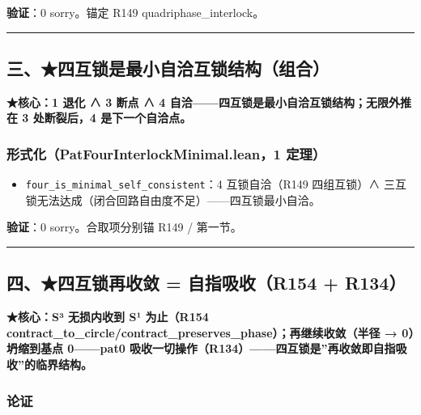 \documentclass[
]{article}
\providecommand{\tightlist}{%
  \setlength{\itemsep}{0pt}\setlength{\parskip}{0pt}}
\begin{document}
\textbf{验证}：0 sorry。锚定 R149 quadriphase\_interlock。

\begin{center}\rule{0.5\linewidth}{0.5pt}\end{center}

\subsection{三、★四互锁是最小自洽互锁结构（组合）}\label{ux4e09ux56dbux4e92ux9501ux662fux6700ux5c0fux81eaux6d3dux4e92ux9501ux7ed3ux6784ux7ec4ux5408}

\textbf{★核心：1 退化 ∧ 3 断点 ∧ 4
自洽------四互锁是最小自洽互锁结构；无限外推在 3 处断裂后，4
是下一个自洽点。}

\subsubsection{形式化（PatFourInterlockMinimal.lean，1
定理）}\label{ux5f62ux5f0fux5316patfourinterlockminimal.lean1-ux5b9aux7406}

\begin{itemize}
\tightlist
\item
  \texttt{four\_is\_minimal\_self\_consistent}：4 互锁自洽（R149
  四组互锁）∧ 三互锁无法达成（闭合回路自由度不足）------四互锁最小自洽。
\end{itemize}

\textbf{验证}：0 sorry。合取项分别锚 R149 / 第一节。

\begin{center}\rule{0.5\linewidth}{0.5pt}\end{center}

\subsection{四、★四互锁再收敛 = 自指吸收（R154 +
R134）}\label{ux56dbux56dbux4e92ux9501ux518dux6536ux655b-ux81eaux6307ux5438ux6536r154-r134}

\textbf{★核心：S³ 无损内收到 S¹ 为止（R154
contract\_to\_circle/contract\_preserves\_phase）；再继续收敛（半径 →
0）坍缩到基点 0------pat0
吸收一切操作（R134）------四互锁是''再收敛即自指吸收''的临界结构。}

\subsubsection{论证}\label{ux8bbaux8bc1-2}
\end{document}
